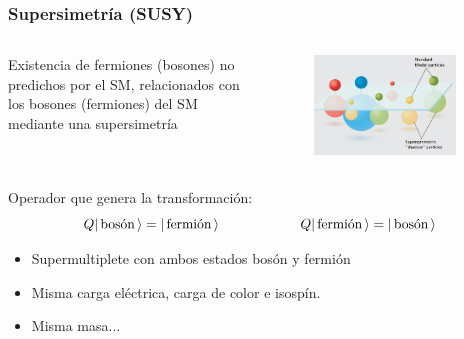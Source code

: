 \documentclass[10pt, compress,spanish]{beamer}
\DeclarePairedDelimiter\ket{\lvert}{\rangle}
\begin{document}
\begin{frame}[fragile]
\frametitle{Supersimetría (SUSY)}

\normalsize




\begin{columns}

\begin{column}{0.5\textwidth} 
Existencia de fermiones (bosones) no predichos por el SM, relacionados con los bosones (fermiones) del SM mediante una supersimetría

\end{column}

\begin{column}{0.5\textwidth} 
\begin{figure}
\includegraphics[width=0.9\textwidth]{supersymmetry2.jpg}
\end{figure}
\end{column}

\end{columns}

\begin{block}{Operador que genera la transformación:}
\begin{equation*}
\centering
Q \ket{\text{\,bosón\,}} = \ket{\text{\,fermión\,}}
\qquad\qquad\qquad
Q \ket{\text{\,fermión\,}} = \ket{\text{\,bosón\,}}
\end{equation*}
\end{block}

\vspace{0.3cm}

\begin{itemize}

  \item Supermultiplete con ambos estados bosón y fermión

  \item Misma carga eléctrica, carga de color e isospín.

  \item Misma masa...

\end{itemize}




\end{frame}
\end{document}
